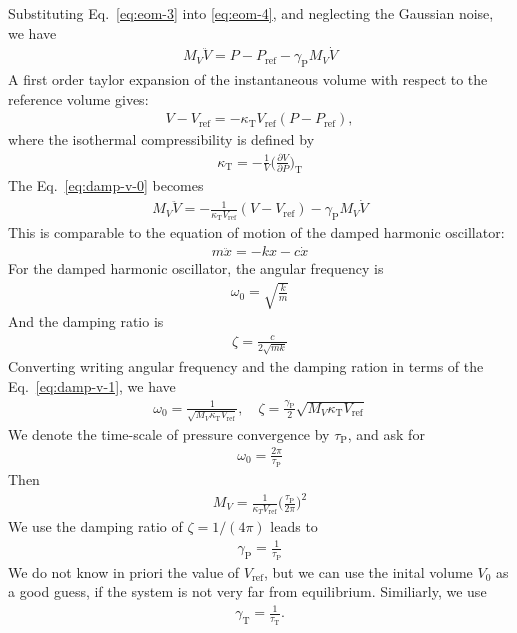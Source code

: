 \documentclass[aps, pre, preprint,unsortedaddress,a4paper,onecolumn]{revtex4}
\newcommand{\target}{\textrm{ref}}
\newcommand{\temp}[0]{{\textrm{T}}}
\newcommand{\pres}[0]{{\textrm{P}}}
\begin{document}
Substituting Eq.~\eqref{eq:eom-3} into \eqref{eq:eom-4}, and neglecting the
Gaussian noise, we have
\begin{align}\label{eq:damp-v-0}
  M_V \ddot V = P - P_\target - \gamma_\pres M_V \dot V 
\end{align}
A first order taylor expansion of the instantaneous volume with respect to the
reference volume gives:
\begin{align}
  V - V_\target = -\kappa_\temp V_\target (P - P_\target),
\end{align}
where the isothermal compressibility is defined by
\begin{align}
  \kappa_\temp =-\frac 1V \Big(\frac{\partial V}{\partial P}\Big)_\temp
\end{align}
The Eq.~\eqref{eq:damp-v-0} becomes
\begin{align}\label{eq:damp-v-1}
  M_V \ddot V = -\frac{1}{\kappa_\temp V_\target}(V - V_\target) - \gamma_\pres M_V \dot V
\end{align}
This is comparable to the equation of motion of the damped harmonic oscillator:
\begin{align}
  m\ddot x = -kx - c\dot x
\end{align}
For the damped harmonic oscillator, the angular frequency is
\begin{align}
  \omega_0 = \sqrt{\frac km}
\end{align}
And the damping ratio is
\begin{align}
  \zeta = \frac{c}{2\sqrt{mk}}
\end{align}
Converting writing angular frequency and the damping ration in terms of the
Eq.~\eqref{eq:damp-v-1}, we have
\begin{align}
  \omega_0 = \frac{1}{\sqrt{M_V \kappa_\temp V_\target}}, \quad
  \zeta = \frac{\gamma_\pres}{2}\sqrt{M_V\kappa_\temp V_\target}
\end{align}
We denote the time-scale of pressure convergence by $\tau_\pres$, and ask for
\begin{align}
  \omega_0 = \frac{2\pi}{\tau_\pres}
\end{align}
Then
\begin{align}
  M_V = \frac{1}{\kappa_T V_\target}\Big(\frac{\tau_\pres}{2\pi}\Big)^2
\end{align}
We use the damping ratio of $\zeta = 1/(4\pi)$ leads to
\begin{align}
  \gamma_\pres = \frac{1}{\tau_\pres}
\end{align}
We do not know in priori the value of $V_\target$, but we can use the
inital volume $V_0$ as a good guess, if the system is not very far from
equilibrium.
Similiarly, we use 
\begin{align}
  \gamma_\temp = \frac{1}{\tau_\temp}.
\end{align}



% 
\end{document}
